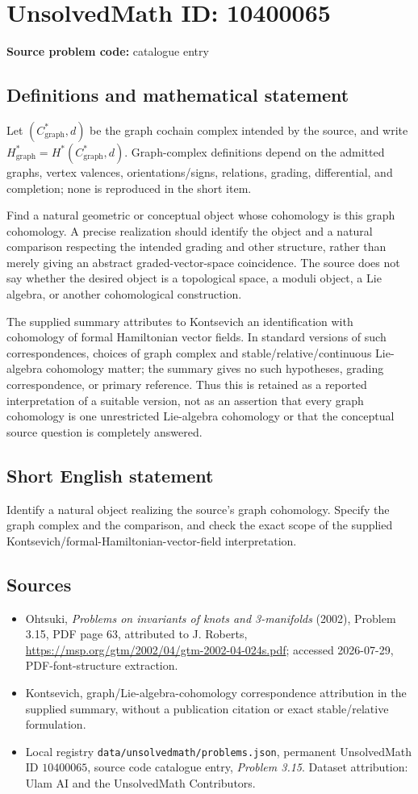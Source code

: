 \documentclass[11pt]{article}
\begin{document}
\section*{UnsolvedMath ID: 10400065}
\textbf{Source problem code:} catalogue entry
\subsection{Definitions and mathematical statement}
Let $(C_{\mathrm{graph}}^*,d)$ be the graph cochain complex intended by the source, and write $H_{\mathrm{graph}}^*=H^*(C_{\mathrm{graph}}^*,d)$. Graph-complex definitions depend on the admitted graphs, vertex valences, orientations/signs, relations, grading, differential, and completion; none is reproduced in the short item.

Find a natural geometric or conceptual object whose cohomology is this graph cohomology. A precise realization should identify the object and a natural comparison respecting the intended grading and other structure, rather than merely giving an abstract graded-vector-space coincidence. The source does not say whether the desired object is a topological space, a moduli object, a Lie algebra, or another cohomological construction.

The supplied summary attributes to Kontsevich an identification with cohomology of formal Hamiltonian vector fields. In standard versions of such correspondences, choices of graph complex and stable/relative/continuous Lie-algebra cohomology matter; the summary gives no such hypotheses, grading correspondence, or primary reference. Thus this is retained as a reported interpretation of a suitable version, not as an assertion that every graph cohomology is one unrestricted Lie-algebra cohomology or that the conceptual source question is completely answered.
\subsection{Short English statement}
Identify a natural object realizing the source's graph cohomology. Specify the graph complex and the comparison, and check the exact scope of the supplied Kontsevich/formal-Hamiltonian-vector-field interpretation.
\subsection{Sources}
\begin{itemize}
\item Ohtsuki, \emph{Problems on invariants of knots and 3-manifolds} (2002), Problem 3.15, PDF page 63, attributed to J. Roberts, \url{https://msp.org/gtm/2002/04/gtm-2002-04-024s.pdf}; accessed 2026-07-29, PDF-font-structure extraction.
\item Kontsevich, graph/Lie-algebra-cohomology correspondence attribution in the supplied summary, without a publication citation or exact stable/relative formulation.
\item Local registry \texttt{data/unsolvedmath/problems.json}, permanent UnsolvedMath ID $10400065$, source code catalogue entry, \emph{Problem 3.15}. Dataset attribution: Ulam AI and the UnsolvedMath Contributors.
\end{itemize}
\end{document}
